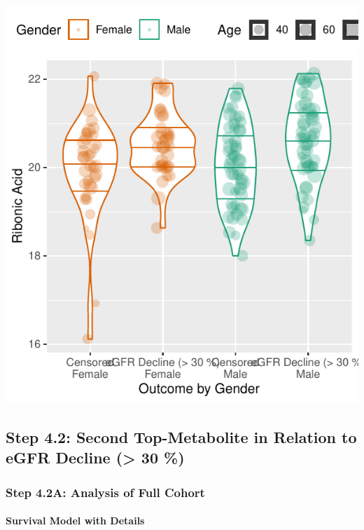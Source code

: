 \documentclass[]{article}
\let\oldparagraph\paragraph
\renewcommand{\paragraph}[1]{\oldparagraph{#1}\mbox{}}
\begin{document}
\includegraphics{0033_PROFIL--Metabolomics_files/figure-latex/Boxplots-RA-2.pdf}

\newpage

\hypertarget{step-4.2-second-top-metabolite-in-relation-to-egfr-decline-30}{%
\subsection{Step 4.2: Second Top-Metabolite in Relation to eGFR Decline
(\textgreater{} 30
\%)}\label{step-4.2-second-top-metabolite-in-relation-to-egfr-decline-30}}

\hypertarget{step-4.2a-analysis-of-full-cohort}{%
\subsubsection{Step 4.2A: Analysis of Full
Cohort}\label{step-4.2a-analysis-of-full-cohort}}

\hypertarget{survival-model-with-details-2}{%
\paragraph{Survival Model with
Details}\label{survival-model-with-details-2}}
\end{document}
